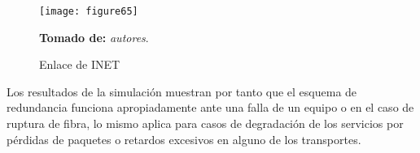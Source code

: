 \begin{figure}[htbp]
  \centering
    {\texttt{[image: figure65]}}%
  \caption{\footnotesize{Enlace de INET}}
  \footnotesize{\textbf{Tomado de:} \textit{autores}.}
  \label{fig:fig2subfig}
\end{figure}

Los resultados de la simulación muestran por tanto que el esquema de redundancia funciona apropiadamente ante una falla de un equipo o en el caso de ruptura de fibra, lo mismo aplica para casos de degradación de los servicios por pérdidas de paquetes o retardos excesivos en alguno de los transportes.